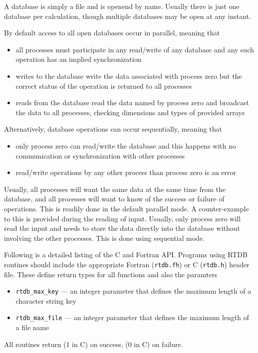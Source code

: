 A database is simply a file and is openend by name. Usually there is
just one database per calculation, though multiple databases may be
open at any instant.  

By default access to all open databases occur in parallel, meaning
that
\begin{itemize}
\item all processes must participate in any read/write of any database
  and any such operation has an implied synchronization
\item writes to the database write the data associated with process
  zero but the correct status of the operation is returned to all
  processes
\item reads from the database read the data named by process zero and
  broadcast the data to all processes, checking dimensions and types
  of provided arrays
\end{itemize}

Alternatively, database operations can occur sequentially, meaning
that
\begin{itemize}
\item only process zero can read/write the database and this happens
  with no communication or synchronization with other processes
\item read/write operations by any other process than process zero is
  an error
\end{itemize}

Usually, all processes will want the same data at the same time from
the database, and all processes will want to know of the success or
failure of operations.  This is readily done in the default parallel
mode.  A counter-example to this is provided during the reading of input.
Usually, only process zero will read the input and needs to store the
data directly into the database without involving the other processes.
This is done using sequential mode.

Following is a detailed listing of the C and Fortran API\@.  
Programs using RTDB routines should include the appropriate Fortran
({\tt rtdb.fh}) or C ({\tt rtdb.h}) header file.   These define return
types for all functions and also the paramters 
\begin{itemize}
\item {\tt rtdb\_max\_key} --- an integer parameter that defines the maximum
  length of a character string key
\item {\tt rtdb\_max\_file} --- an integer parameter that defines the maximum
  length of a file name
\end{itemize}
All routines return \TRUE (1 in C) on success, \FALSE (0
in C) on failure.

